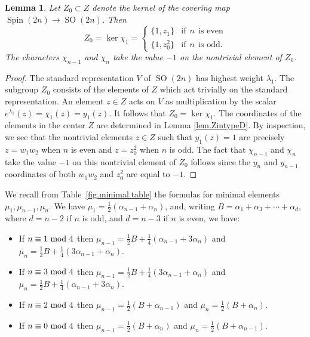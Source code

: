 \documentclass[reqno,11pt]{amsart}
\newtheorem{Lem}[Thm]{Lemma}
\theoremstyle{remark}
\theoremstyle{remark}
\theoremstyle{definition}
\theoremstyle{definition}
\theoremstyle{definition}
\numberwithin{equation}{section}
\renewcommand{\ker}{\operatorname{ker }}
\newcommand{\SO}{\operatorname{SO}}
\newcommand{\Spin}{\operatorname{Spin}}
\newcommand{\ga}{\alpha}
\newcommand{\gl}{\lambda}
\begin{document}
\begin{Lem} \label{lem.kernel}
Let $Z_0 \subset Z $ denote the kernel of the covering map $\Spin(2n) \to \SO(2n)$.  
Then
$$
Z_0 = \ker \chi_1 = \begin{cases} \{ 1, z_1 \} & \mbox{if} \  \  n  \ \ \mbox{is even} \\
\{1, z_0^2 \} &\mbox{if} \  \  n  \ \ \mbox{is odd}.
\end{cases}
$$
The characters $\chi_{n-1}$ and $\chi_n$ take the value $-1$ on the nontrivial element of $Z_0$.
\end{Lem}

\begin{proof}
The standard representation $V$ of $\SO(2n)$ has highest weight $\gl_1$.  The subgroup $Z_0$ consists of the elements of $Z$ which
act trivially on the standard representation.  An element $z \in Z$ acts on $V$ as multiplication by the scalar $e^{\gl_1}(z) =  \chi_1(z)=y_1(z)$.
It follows that $Z_0 = \ker \chi_1$.  The coordinates of the elements in the center $Z$ are determined in Lemma \ref{lem.ZintypeD}.  By inspection, we see that the nontrivial  elements $z \in Z$ such that $y_1 (z) = 1$ are precisely $z=w_1w_2$ when $n$ is even and $z=z_0^2$ when $n$ is odd.   The fact that $\chi_{n-1}$ and $\chi_n$ take the value $-1$ on this nontrivial element of $Z_0$ follows since the $y_{n}$ and $y_{n-1}$ coordinates of both $w_1w_2$ and $z_0^2$ are equal to $-1$. 
\end{proof}

We recall from  Table~\ref{fig.minimal.table} the formulas for minimal elements $\mu_1, \mu_{n-1},\mu_n$.  We have $\mu_1 =  \frac{1}{2}(\alpha_{n-1}+\alpha_n)$, and, writing 
$B = \ga_1 + \ga_3 + \cdots + \ga_d$, where $d = n-2$ if $n$ is odd, and $d = n-3$ if $n$ is even, we have:
\begin{itemize}
\item If $n \equiv 1 \textup{ mod }4$ then $\mu_{n-1} =  \frac{1}{2} B +  \frac{1}{4} (\alpha_{n-1}+3 \alpha_n)$ and $\mu_n =  \frac{1}{2} B + \frac{1}{4}( 3 \alpha_{n-1}+\alpha_n)$.

\item If $n \equiv 3 \textup{ mod }4$ then 
$\mu_{n-1} =  \frac{1}{2}B  +   \frac{1}{4}( 3 \alpha_{n-1}+\alpha_n)$ and $\mu_n =  \frac{1}{2} B + \frac{1}{4} (\alpha_{n-1}+3 \alpha_n)$.

\item If $n \equiv 2 \textup{ mod }4$ then $\mu_{n-1} =  \frac{1}{2} (B +  \alpha_{n-1})$ and $\mu_{n} =  \frac{1}{2} (B +  \alpha_n)$.

\item If $n \equiv 0 \textup{ mod }4$ then $\mu_{n-1} =  \frac{1}{2} (B +  \alpha_n)$ and $\mu_{n} =  \frac{1}{2} (B +  \alpha_{n-1})$.
\end{itemize}
\end{document}
